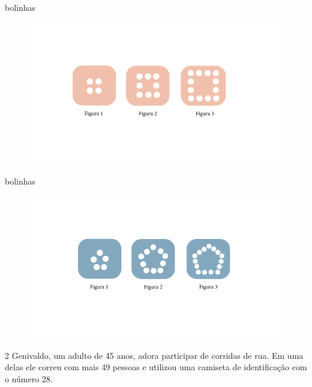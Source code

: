 \begin{escolha}

\item\preencher{} bolinhas

\begin{figure}[htpb!]
\includegraphics[width=\textwidth]{../ilustracoes/MAT5/SAEB_5ANO_MAT_figura25.png}
\end{figure}



\item\preencher{} bolinhas

\begin{figure}[htpb!]
\includegraphics[width=\textwidth]{../ilustracoes/MAT5/SAEB_5ANO_MAT_figura26.png}
\end{figure}


\end{escolha}

\num{2} Genivaldo, um adulto de 45 anos, adora participar de corridas de
rua. Em uma delas ele correu com mais 49 pessoas e utilizou uma camiseta
de identificação com o número 28.

